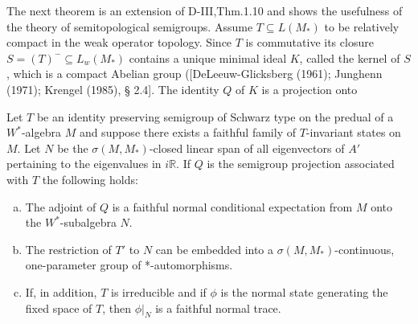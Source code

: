 The next theorem is an extension of D-III,Thm.1.10 and shows the usefulness of the theory of semitopological semigroups.
Assume $T \subseteq L(M_{*})$ to be relatively compact in the weak operator topology.
Since $T$ is commutative its closure $S = (T)^{-} \subseteq L_{w}(M_{*})$ contains a unique minimal ideal $K$, called the kernel of $S$, which is a compact Abelian group ([DeLeeuw-Glicksberg (1961); Junghenn (1971); Krengel (1985), § 2.4].
The identity $Q$ of $K$ is a projection onto

\newpage

\begin{theorem}\label{thm:d4-3-5}
Let $T$ be an identity preserving semigroup of Schwarz type on the predual of a $W^*$-algebra $M$ and suppose there exists a faithful family of $T$-invariant states on $M$.
Let $N$ be the $\sigma(M,M_{*})$-closed linear span of all eigenvectors of $A'$ pertaining to the eigenvalues in $i\mathbb{R}$.
If $Q$ is the semigroup projection associated with $T$ the following holds:

\begin{enumerate}[(a)]
\item
The adjoint of $Q$ is a faithful normal conditional expectation from $M$ onto the $W^*$-subalgebra $N$.

\item
The restriction of $T'$ to $N$ can be embedded into a $\sigma(M,M_{*})$-continuous, one-parameter group of *-automorphisms.

\item
If, in addition, $T$ is irreducible and if $\phi$ is the normal state generating the fixed space of $T$, then $\phi|_{N}$ is a faithful normal trace.
\end{enumerate}
\end{theorem}

